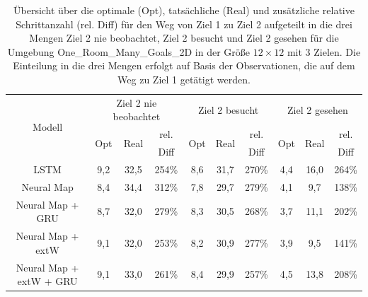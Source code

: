 \begin{table}
  \begin{tabular}{|c|c|c|c|c|c|c|c|c|c|}
    \hline
    \multirow{3}{*}{Modell} & \multicolumn{3}{|c|}{Ziel 2 nie beobachtet} & \multicolumn{3}{|c|}{Ziel 2 besucht} & \multicolumn{3}{|c|}{Ziel 2 gesehen} \\ \cline{2-10}
    & \multirow{2}{*}{Opt} & \multirow{2}{*}{Real} & rel. & \multirow{2}{*}{Opt} & \multirow{2}{*}{Real} & rel. & \multirow{2}{*}{Opt} & \multirow{2}{*}{Real} & rel. \\
    & & & Diff & & & Diff & & & Diff \\ \hline
    LSTM & 9,2 & 32,5 & 254\% & 8,6 & 31,7 & 270\% & 4,4 & 16,0 & 264\% \\ \hline
    Neural Map & 8,4 & 34,4 & 312\% & 7,8 & 29,7 & 279\% & 4,1 & 9,7 & 138\% \\ \hline
    Neural Map + GRU & 8,7 & 32,0 & 279\% & 8,3 & 30,5 & 268\% & 3,7 & 11,1 & 202\% \\ \hline
    Neural Map + extW & 9,1 & 32,0 & 253\% & 8,2 & 30,9 & 277\% & 3,9 & 9,5 & 141\% \\ \hline
    Neural Map + extW + GRU & 9,1 & 33,0 & 261\% & 8,4 & 29,9 & 257\% & 4,5 & 13,8 & 208\% \\ \hline
  \end{tabular}
  \caption{Übersicht über die optimale (Opt), tatsächliche (Real) und zusätzliche relative Schrittanzahl (rel. Diff) für den Weg von Ziel 1 zu Ziel 2 aufgeteilt in die drei Mengen \glqq Ziel 2 nie beobachtet\grqq{}, \glqq Ziel 2 besucht\grqq{} und \glqq Ziel 2 gesehen\grqq{} für die Umgebung \glqq One\_Room\_Many\_Goals\_2D\grqq{} in der Größe $12 \times 12$ mit 3 Zielen. Die Einteilung in die drei Mengen erfolgt auf Basis der Observationen, die auf dem Weg zu Ziel 1 getätigt werden.}
  \label{results12x12_1_to_2_per_M}
\end{table}

